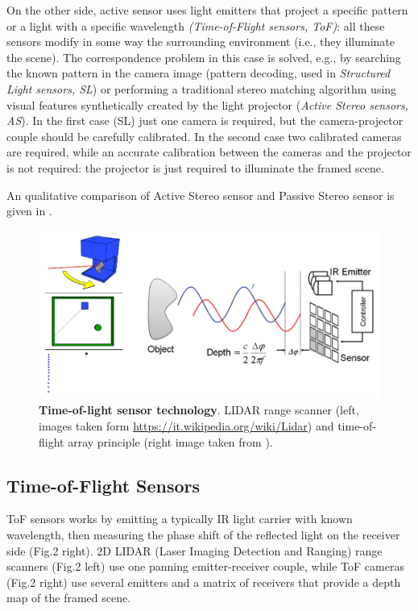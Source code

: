 On the other side, active sensor uses light emitters that project a specific pattern or a light with a specific wavelength \emph{(​Time-of-Flight sensors, ToF)}: all these sensors modify in some way the surrounding environment (i.e., they illuminate the scene). The correspondence problem in this case is solved, e.g., by searching the known pattern in the camera image (pattern decoding, used in ​ \emph{Structured Light sensors, SL}) or performing a traditional stereo matching algorithm using visual features synthetically created by the light projector (​\emph{Active Stereo sensors, AS}).
In the first case (SL) just one camera is required, but the camera-projector couple should be carefully calibrated. In the second case two calibrated cameras are required, while an accurate calibration between the cameras and the projector is not required: the projector is just required to illuminate the framed scene.

An qualitative comparison of Active Stereo sensor and Passive Stereo sensor is given in .

\begin{figure}
    \centering
    \includegraphics[width=\textwidth]{figures/1_perception_and_sensing_in_robotics/tof_sensors}
    \caption{\textbf{Time-of-light sensor technology}. LIDAR range scanner (left, images taken form ​\url{https://it.wikipedia.org/wiki/Lidar​}) and time-of-flight array principle (right image taken from \cite{Shim2012tof}).} 
    \label{fig:tof_sensors}
\end{figure}

\subsection{Time-of-Flight Sensors}\label{subsec:tof_sensors}
ToF sensors works by emitting a typically IR light carrier with known wavelength, then measuring the phase shift of the reflected light on the receiver side (Fig.2 right). 2D LIDAR (Laser Imaging Detection and Ranging) range scanners (Fig.2 left) use one panning emitter-receiver couple, while ToF cameras (Fig.2 right) use several emitters and a matrix of receivers that provide a depth map of the framed scene.

